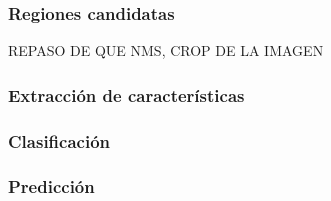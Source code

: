 \subsubsection*{Regiones candidatas}

REPASO DE QUE NMS, CROP DE LA IMAGEN



\subsubsection*{Extracción de características}
\subsubsection*{Clasificación}
\subsubsection*{Predicción}

